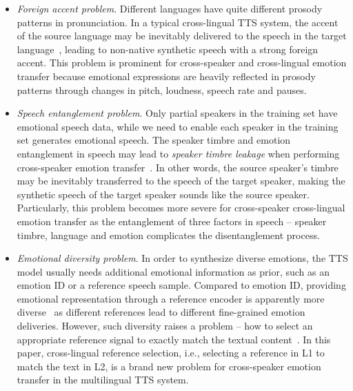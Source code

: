 \documentclass[journal,comsoc]{IEEEtran}
\begin{document}
\begin{itemize}
  \item

\textit{Foreign accent problem}. Different languages have quite different prosody patterns in pronunciation. In a typical cross-lingual TTS system, the accent of the source language may be inevitably delivered to the speech in the target language~\cite{DBLP:conf/interspeech/ZhangWZWCSJRR19}, leading to non-native synthetic speech with a strong foreign accent. This problem is prominent for cross-speaker and cross-lingual emotion transfer because emotional expressions are heavily reflected in prosody patterns through changes in pitch, loudness, speech rate and pauses.

\item

 \textit{Speech entanglement problem}. 
Only partial speakers in the training set have emotional speech data, while we need to enable each speaker in the training set generates emotional speech. The speaker timbre and emotion entanglement in speech may lead to \textit{speaker timbre leakage} when performing cross-speaker emotion transfer~\cite{DBLP:journals/spl/LeiYZXS22}. In other words, the source speaker's timbre may be inevitably transferred to the speech of the target speaker, making the synthetic speech of the target speaker sounds like the source speaker. Particularly, this problem becomes more severe for cross-speaker cross-lingual emotion transfer as the entanglement of three factors in speech -- speaker timbre, language and emotion complicates the disentanglement process.
\item
 \textit{Emotional diversity problem}. In order to synthesize diverse emotions, the TTS model usually needs additional emotional information as prior, such as an emotion ID or a reference speech sample. Compared to emotion ID, providing emotional representation through a reference encoder is apparently more diverse~\cite{DBLP:journals/corr/abs-2206-14866} as different references lead to different fine-grained emotion deliveries. However, such diversity raises a problem -- how to select an appropriate reference signal to exactly match the textual content~\cite{DBLP:conf/interspeech/MengL0LSXSZM22}. In this paper, cross-lingual reference selection, i.e., selecting a reference in L1 to match the text in L2, is a brand new problem for cross-speaker emotion transfer in the multilingual TTS system.
 

\end{itemize}
\end{document}

